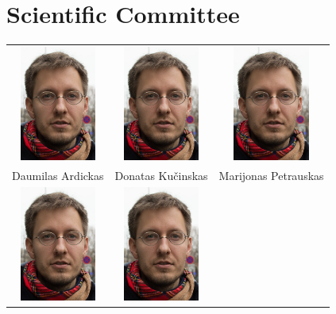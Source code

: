 \documentclass[a5paper,10pt,twoside]{book}
\begin{document}
\blindtext

\blindtext

\blindtext

\chapter{Scientific Committee}

\setlength{\tabcolsep}{0.3cm}
\begin{tabular}{ c c c }
    \includegraphics[width=2.5cm]{SC-LinasPetrauskas} &
    \includegraphics[width=2.5cm]{SC-LinasPetrauskas} &
    \includegraphics[width=2.5cm]{SC-LinasPetrauskas} \\
    Daumilas Ardickas &
    Donatas Kučinskas &
    Marijonas Petrauskas \\ [0.5cm]
    \includegraphics[width=2.5cm]{SC-LinasPetrauskas} &
    \includegraphics[width=2.5cm]{SC-LinasPetrauskas} &

\end{tabular}
\end{document}
